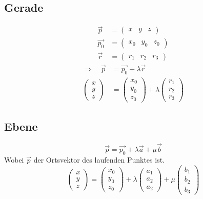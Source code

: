 \subsection{Gerade}
\begin{align}
\vec{p} & = \begin{pmatrix}x & y & z\end{pmatrix} \\
\vec{p_0} & = \begin{pmatrix}x_0 & y_0 & z_0\end{pmatrix} \\
\vec{r} & = \begin{pmatrix}r_1 & r_2 & r_3\end{pmatrix}
\end{align}
\begin{align}
\Rightarrow \quad \vec{p} & = \vec{p_0}+\lambda\vec{r} \\
\begin{pmatrix}x\\y\\z\end{pmatrix} & = \begin{pmatrix}x_0\\y_0\\z_0\end{pmatrix}+\lambda\begin{pmatrix}r_1\\r_2\\r_3\end{pmatrix}
\end{align}


\subsection{Ebene}
\begin{equation}
\vec{p} = \vec{p_0}+\lambda\vec{a}+\mu\vec{b}
\end{equation}
Wobei $\vec{p}$ der Ortsvektor des laufenden Punktes ist.
\begin{equation}
  \begin{pmatrix}x\\y\\z\end{pmatrix} =
  \begin{pmatrix}x_0\\y_0\\z_0\end{pmatrix}+\lambda
  \begin{pmatrix}a_1\\a_2\\a_2\end{pmatrix}+\mu
  \begin{pmatrix}b_1\\b_2\\b_3\end{pmatrix}
\end{equation}


